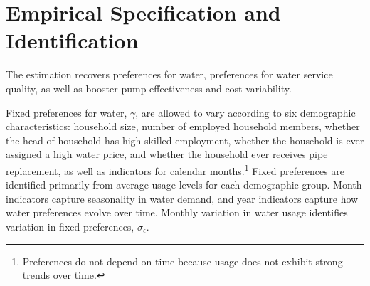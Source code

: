 \documentclass[12pt,table]{article}
\begin{document}


\section{Empirical Specification and Identification}

The estimation recovers preferences for water, preferences for water service quality, as well as booster pump effectiveness and cost variability.

Fixed preferences for water, $\gamma$, are allowed to vary according to six demographic characteristics: household size, number of employed household members, whether the head of household has high-skilled employment, whether the household is ever assigned a high water price, and whether the household ever receives pipe replacement, as well as indicators for calendar months.\footnote{Preferences do not depend on time because usage does not exhibit strong trends over time.}  Fixed preferences are identified primarily from average usage levels for each demographic group. Month indicators capture seasonality in water demand, and year indicators capture how water preferences evolve over time.  Monthly variation in water usage identifies variation in fixed preferences, $\sigma_{\epsilon}$.
\end{document}
